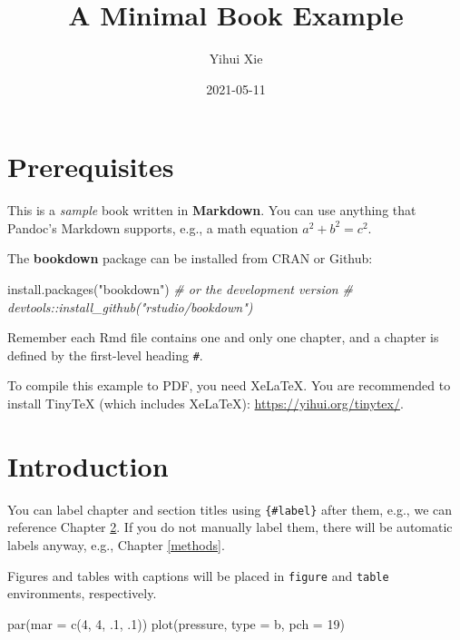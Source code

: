 \documentclass[
]{book}
\title{A Minimal Book Example}
\author{Yihui Xie}
\date{2021-05-11}
\newenvironment{Shaded}{\begin{snugshade}}{\end{snugshade}}
\newcommand{\AttributeTok}[1]{\textcolor[rgb]{0.77,0.63,0.00}{#1}}
\newcommand{\CommentTok}[1]{\textcolor[rgb]{0.56,0.35,0.01}{\textit{#1}}}
\newcommand{\DecValTok}[1]{\textcolor[rgb]{0.00,0.00,0.81}{#1}}
\newcommand{\FunctionTok}[1]{\textcolor[rgb]{0.00,0.00,0.00}{#1}}
\newcommand{\NormalTok}[1]{#1}
\newcommand{\StringTok}[1]{\textcolor[rgb]{0.31,0.60,0.02}{#1}}
\begin{document}
\maketitle

{
\setcounter{tocdepth}{1}
\tableofcontents
}
\hypertarget{prerequisites}{%
\chapter{Prerequisites}\label{prerequisites}}

This is a \emph{sample} book written in \textbf{Markdown}. You can use anything that Pandoc's Markdown supports, e.g., a math equation \(a^2 + b^2 = c^2\).

The \textbf{bookdown} package can be installed from CRAN or Github:

\begin{Shaded}
\begin{Highlighting}[]
\FunctionTok{install.packages}\NormalTok{(}\StringTok{"bookdown"}\NormalTok{)}
\CommentTok{\# or the development version}
\CommentTok{\# devtools::install\_github("rstudio/bookdown")}
\end{Highlighting}
\end{Shaded}

Remember each Rmd file contains one and only one chapter, and a chapter is defined by the first-level heading \texttt{\#}.

To compile this example to PDF, you need XeLaTeX. You are recommended to install TinyTeX (which includes XeLaTeX): \url{https://yihui.org/tinytex/}.

\hypertarget{intro}{%
\chapter{Introduction}\label{intro}}

You can label chapter and section titles using \texttt{\{\#label\}} after them, e.g., we can reference Chapter \ref{intro}. If you do not manually label them, there will be automatic labels anyway, e.g., Chapter \ref{methods}.

Figures and tables with captions will be placed in \texttt{figure} and \texttt{table} environments, respectively.

\begin{Shaded}
\begin{Highlighting}[]
\FunctionTok{par}\NormalTok{(}\AttributeTok{mar =} \FunctionTok{c}\NormalTok{(}\DecValTok{4}\NormalTok{, }\DecValTok{4}\NormalTok{, .}\DecValTok{1}\NormalTok{, .}\DecValTok{1}\NormalTok{))}
\FunctionTok{plot}\NormalTok{(pressure, }\AttributeTok{type =} \StringTok{\textquotesingle{}b\textquotesingle{}}\NormalTok{, }\AttributeTok{pch =} \DecValTok{19}\NormalTok{)}
\end{Highlighting}
\end{Shaded}
\end{document}
